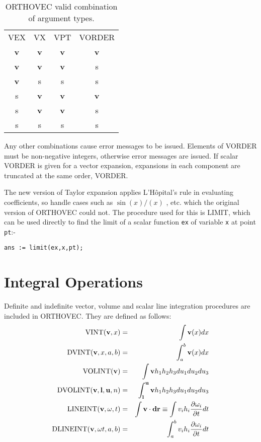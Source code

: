 \begin{table}
\begin{center}
\begin{tabular}{cccc}
VEX & VX & VPT &  VORDER \\[2ex]
{\bf v} & {\bf v} &  {\bf v} &  {\bf v}\\
{\bf v} &  {\bf v} & {\bf v} & s\\
{\bf v} & s & s & s \\
s & {\bf v} &  {\bf v} & {\bf v}   \\
s & {\bf v} & {\bf v} & s\\
s & s & s & s\\
\end{tabular}
\end{center}
\caption{ORTHOVEC valid combination of argument types.}\label{ORTHOVEC:validexp}
\end{table}

Any other combinations cause error messages to be issued.  Elements of
VORDER must be non-negative integers, otherwise error messages are
issued.  If scalar VORDER is given for a vector expansion, expansions
in each component are truncated at the same order, VORDER.

The new version of Taylor expansion applies 
L'H\^opital's rule in evaluating coefficients, so handle cases such as
$\sin(x) / (x) $ , etc.  which the original version of ORTHOVEC could
not. The procedure used for this is LIMIT,  which can
be used directly to find the limit of a scalar function {\tt ex} of
variable {\tt x} at point {\tt pt}:-

\begin{verbatim}
ans := limit(ex,x,pt);
\end{verbatim}

\section{Integral Operations}
Definite and indefinite vector, volume and scalar line integration
procedures are included in ORTHOVEC.  They are defined as follows:
 
   
\begin{eqnarray*}
{\rm VINT} ({\bf v},x) & = & \int {\bf v}(x)dx\\
%
{\rm DVINT} ({\bf v},x, a, b) & = & \int^b_a {\bf v} (x) dx\\
%
{\rm VOLINT} ({\bf v}) & = & \int {\bf v} h_1 h_2 h_3 du_1 du_2 du_3\\
%
{\rm DVOLINT}({\bf v},{\bf l},{\bf u},n) & = & \int^{\bf u}_{\bf l}
{\bf v} h_1 h_2 h_3 du_1 du_2 du_3\\
%
{\rm LINEINT} ({\bf v, \omega}, t) & = & \int {\bf v} \cdot {\bf dr}
\equiv \int v_i h_i \frac{\partial \omega_i}{\partial t} dt\\
%
{\rm DLINEINT} ({\bf v, \omega} t, a, b) & = & \int^b_a v_i h_i
\frac{\partial \omega_i}{\partial t} dt\\
\end{eqnarray*}

